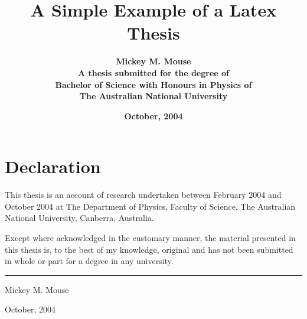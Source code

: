 \documentclass[twoside,onecolumn,11pt,a4paper]{scrartcl}
\begin{document}

\begin{titlepage}
\title{\textbf{A Simple Example of a Latex Thesis}\\[2cm]}
 \author{\textbf{Mickey M. Mouse}\\[6cm]
 \textbf{A thesis submitted for the degree of}\\
 \textbf{Bachelor of Science with Honours in Physics of} \\
 \textbf{The Australian National University}\\[1cm]}
 \date{\textbf{October, 2004}}
\maketitle
 \end{titlepage}
 
 \sloppy
 
\chapter*{Declaration}

This thesis is an account of research undertaken between February 2004 and 
October 2004 at The Department of Physics, Faculty of Science, 
The Australian National University, Canberra, Australia.

Except where acknowledged in the customary manner, the material 
presented in this thesis is, to the best of my knowledge, original and 
has not been submitted in whole or part for a degree in any 
university.

\vspace{20mm}  %

\hspace{80mm}\rule{40mm}{.15mm}\par   %
\hspace{80mm} Mickey M. Mouse\par
\hspace{80mm} October, 2004




\tableofcontents
\listoffigures %

\setcounter{page}{1}  %




\end{document}
